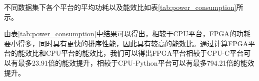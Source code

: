 不同数据集下各个平台的平均功耗以及能效比如表\ref{tab:power_consumption}所示。


\begin{table}[htbp]
\centering
\caption{不同数据集下各个平台的平均功耗、能效比以及FPGA相较于CPU的加速比}
\label{tab:power_consumption}
\end{table}
由表\ref{tab:power_consumption}中结果可以得出，相较于CPU平台，FPGA的功耗要小得多，同时具有更快的排序性能，因此具有较高的能效比。通过计算FPGA平台的能效比和CPU平台的能效比，我们可以得出FPGA平台相较于CPU-C平台可以有最多23.91倍的能效提升，相较于CPU-Python平台可以有最多794.21倍的能效提升。


